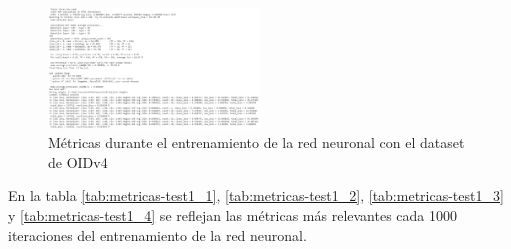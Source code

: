 \begin{figure}[ht]
\centering
\includegraphics[width=0.5\textwidth]{img/chapters/resultados/metricas/metrics-during-training.png}
\caption{\label{fig:metrics-during-train}Métricas durante el entrenamiento de la red neuronal con el dataset de OIDv4}
\end{figure}

En la tabla \ref{tab:metricas-test1_1}, \ref{tab:metricas-test1_2}, \ref{tab:metricas-test1_3} y \ref{tab:metricas-test1_4} se reflejan las métricas más relevantes cada 1000 iteraciones del entrenamiento de la red neuronal.

